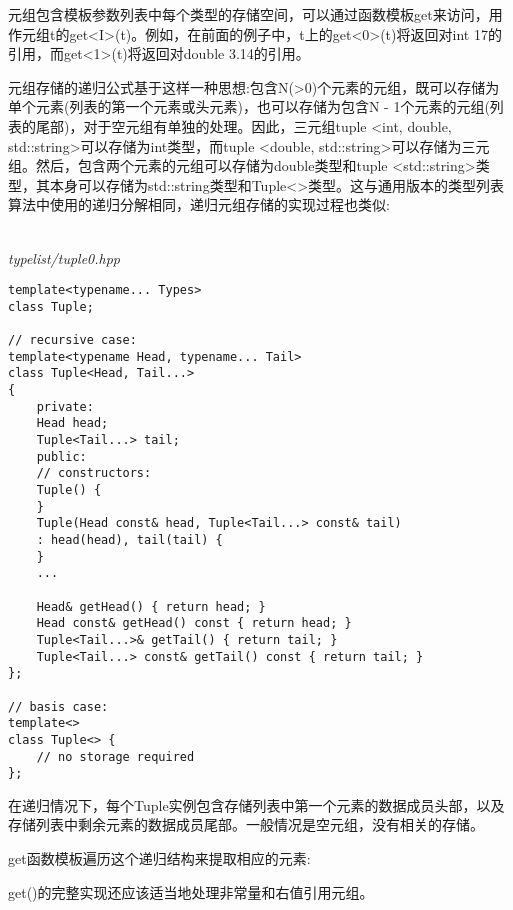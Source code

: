 



元组包含模板参数列表中每个类型的存储空间，可以通过函数模板get来访问，用作元组t的get<I>(t)。例如，在前面的例子中，t上的get<0>(t)将返回对int 17的引用，而get<1>(t)将返回对double 3.14的引用。

元组存储的递归公式基于这样一种思想:包含N(>0)个元素的元组，既可以存储为单个元素(列表的第一个元素或头元素)，也可以存储为包含N - 1个元素的元组(列表的尾部)，对于空元组有单独的处理。因此，三元组tuple <int, double, std::string>可以存储为int类型，而tuple <double, std::string>可以存储为三元组。然后，包含两个元素的元组可以存储为double类型和tuple <std::string>类型，其本身可以存储为std::string类型和Tuple<>类型。这与通用版本的类型列表算法中使用的递归分解相同，递归元组存储的实现过程也类似:

\hspace*{\fill} \\ %
\noindent
\textit{typelist/tuple0.hpp}
\begin{lstlisting}[style=styleCXX]
template<typename... Types>
class Tuple;

// recursive case:
template<typename Head, typename... Tail>
class Tuple<Head, Tail...>
{
	private:
	Head head;
	Tuple<Tail...> tail;
	public:
	// constructors:
	Tuple() {
	}
	Tuple(Head const& head, Tuple<Tail...> const& tail)
	: head(head), tail(tail) {
	}
	...
	
	Head& getHead() { return head; }
	Head const& getHead() const { return head; }
	Tuple<Tail...>& getTail() { return tail; }
	Tuple<Tail...> const& getTail() const { return tail; }
};

// basis case:
template<>
class Tuple<> {
	// no storage required
};
\end{lstlisting}

在递归情况下，每个Tuple实例包含存储列表中第一个元素的数据成员头部，以及存储列表中剩余元素的数据成员尾部。一般情况是空元组，没有相关的存储。

get函数模板遍历这个递归结构来提取相应的元素:

\begin{tcolorbox}[colback=webgreen!5!white,colframe=webgreen!75!black]
\hspace*{0.75cm}get()的完整实现还应该适当地处理非常量和右值引用元组。
\end{tcolorbox}


